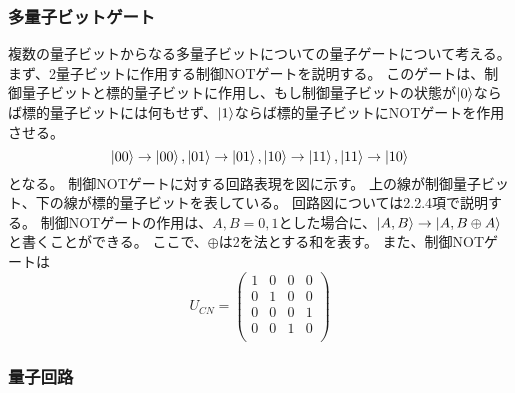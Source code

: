 \subsubsection{多量子ビットゲート}
複数の量子ビットからなる多量子ビットについての量子ゲートについて考える。
まず、2量子ビットに作用する制御NOTゲートを説明する。
このゲートは、制御量子ビットと標的量子ビットに作用し、もし制御量子ビットの状態が$\ket{0}$ならば標的量子ビットには何もせず、$\ket{1}$ならば標的量子ビットにNOTゲートを作用させる。
\begin{equation}
    \ket{00} \rightarrow \ket{00}, 
    \ket{01} \rightarrow \ket{01},
    \ket{10} \rightarrow \ket{11},
    \ket{11} \rightarrow \ket{10}
\end{equation}
となる。
制御NOTゲートに対する回路表現を図に示す。
上の線が制御量子ビット、下の線が標的量子ビットを表している。
回路図については2.2.4項で説明する。
制御NOTゲートの作用は、$A, B = 0, 1$とした場合に、$\ket{A, B} \rightarrow \ket{A, B \oplus A}$と書くことができる。
ここで、$\oplus$は2を法とする和を表す。
また、制御NOTゲートは
\begin{equation}
    U_{CN} = \begin{pmatrix}
        1 & 0 & 0 & 0 \\
        0 & 1 & 0 & 0 \\
        0 & 0 & 0 & 1 \\
        0 & 0 & 1 & 0 \\
    \end{pmatrix}
\end{equation}

\subsubsection{量子回路}

